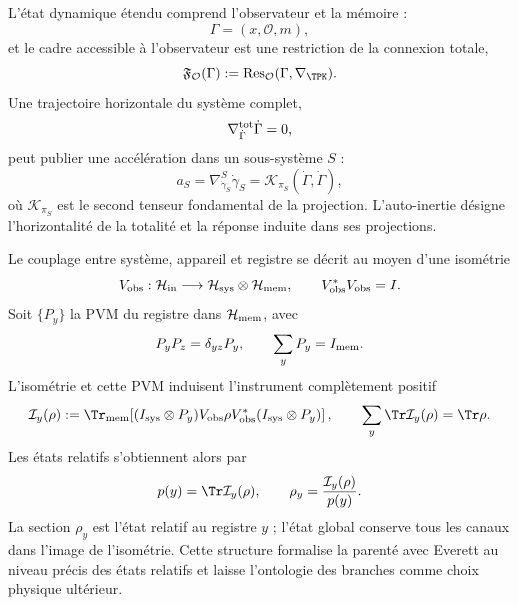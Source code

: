 L'état dynamique étendu comprend l'observateur et la mémoire :
\begin{equation}
 \Gamma=(x,\mathcal O,m),
 \label{eq:descendant-observer-state}
\end{equation}
et le cadre accessible à l'observateur est une restriction de la connexion totale,
\begin{equation}
 \mathfrak F_{\mathcal O}(\Gamma)
 :=\operatorname{Res}_{\mathcal O}
 (\Gamma,\nabla_{\TPK}).
 \label{eq:descendant-observer-frame}
\end{equation}
Une trajectoire horizontale du système complet,
\begin{equation}
 \nabla^{\rm tot}_{\dot\Gamma}\dot\Gamma=0,
 \label{eq:descendant-total-horizontal}
\end{equation}
peut publier une accélération dans un sous-système \(S\) :
\begin{equation}
 a_S=\nabla^S_{\dot\gamma_S}\dot\gamma_S
 =\mathcal K_{\pi_S}(\dot\Gamma,\dot\Gamma),
 \label{eq:descendant-projected-acceleration}
\end{equation}
où \(\mathcal K_{\pi_S}\) est le second tenseur fondamental de la
projection. L'auto-inertie désigne l'horizontalité de la totalité et la
réponse induite dans ses projections.

Le couplage entre système, appareil et registre se décrit au moyen d'une
isométrie
\begin{equation}
 V_{\rm obs}:\mathcal H_{\rm in}\longrightarrow
 \mathcal H_{\rm sys}\otimes\mathcal H_{\rm mem},
 \qquad
 V_{\rm obs}^*V_{\rm obs}=I.
 \label{eq:descendant-observer-isometry}
\end{equation}
Soit \(\{P_y\}\) la PVM du registre dans \(\mathcal H_{\rm mem}\), avec
\begin{equation}
 P_yP_z=\delta_{yz}P_y,
 \qquad
 \sum_yP_y=I_{\rm mem}.
 \label{eq:descendant-observer-PVM}
\end{equation}
L'isométrie et cette PVM induisent l'instrument complètement positif
\begin{equation}
 \mathcal I_y(\rho)
 :=\Tr_{\rm mem}\!\left[
 (I_{\rm sys}\otimes P_y)V_{\rm obs}\rho V_{\rm obs}^*
 (I_{\rm sys}\otimes P_y)
 \right],
 \qquad
 \sum_y\Tr\mathcal I_y(\rho)=\Tr\rho.
 \label{eq:descendant-observer-instrument}
\end{equation}
Les états relatifs s'obtiennent alors par
\begin{equation}
 p(y)=\Tr\mathcal I_y(\rho),
 \qquad
 \rho_y=\frac{\mathcal I_y(\rho)}{p(y)}.
 \label{eq:descendant-relative-state}
\end{equation}
La section \(\rho_y\) est l'état relatif au registre \(y\) ; l'état
global conserve tous les canaux dans l'image de l'isométrie. Cette
structure formalise la parenté avec Everett au niveau précis des
états relatifs et laisse l'ontologie des branches comme choix physique
ultérieur.

